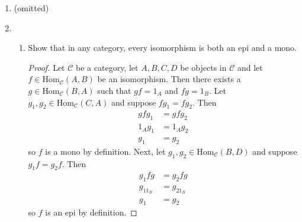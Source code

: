 \documentclass[11pt,oneside,english]{amsart}
\theoremstyle{definition}
\newcommand{\MS}[1]{\mathscr{#1}}
\newcommand{\im}{\text{im\,}}
\newcommand{\Hom}{\text{Hom}}
\begin{document}
\begin{enumerate}[leftmargin=*]
{\begin{proof}
Next we show that $\gamma_2$ is injective. Let $m_{2}\in\ker\gamma_{2}$, so $\gamma_{2}(m_{2})=0$. By commutativity, $\gamma_{1}\alpha_{2}(m_{2})=\beta_{2}\gamma_{2}(m_{2})=\beta_{2}(0)=0$. By injectivity of $\gamma_{1}$, $\alpha_{2}(m_{2})=0$ so $m_{2}\in\ker\alpha_{2}=\im\alpha_{3}$. Hence there exists an $m_{3}\in M_{3}$ such that $\alpha_{3}(m_{3})=m_{2}$. Now by substitution and commutativity, $0=\gamma_{2}(m_{2})=\gamma_{2}\alpha_{3}(m_{3})=\beta_{3}\gamma_{3}(m_{3})$. Thus, $\beta_{3}\gamma_{3}(m_{3})=0$ so $\gamma_{3}(m_{3})\in\ker\beta_{3}=\text{im}\beta_{4}$. So there exists an $n_{4}\in N_{4}$ such that $\beta_{4}(n_{4})=\gamma_{3}(m_{3})$. By surjectivity of $\gamma_{4}$ there exists an $m_{4}\in M_{4}$ such that $\gamma_{4}(m_{4})=n_{4}$. So by substitution, $\gamma_{3}(m_{3})=\beta_{4}(n_{4})=\beta_{4}\gamma_{4}(m_{4})$. By commutativity, $\gamma_{3}(m_{3})=\beta_{4}\gamma_{4}(m_{4})=\gamma_{3}\alpha_{4}(m_{4})$ so $\gamma_{3}(m_{3})-\gamma_{3}\alpha_{4}(m_{4})=\gamma_{3}(m_{3}-\alpha_{4}(m_{4}))=0$. By injectivity of $\gamma_{3}$, $m_{3}-\alpha_{4}(m_{4})=0$ so $m_{3}=\alpha_{4}(m_{4})$. Finally, by substitution and exactness, $m_{2}=\alpha_{3}(m_{3})=\alpha_{3}\alpha_{4}(m_{4})=0$. Since $m_2$ was chosen arbitrarily, $\ker\gamma_{2}=0$ and hence $\gamma_{2}$ is injective.
\end{proof}
}
\pagebreak

\item (omitted)

\item \begin{enumerate}
\item Show that in any category, every isomorphism is both an epi and a mono.

\begin{proof}
Let $\mathscr{C}$ be a category, let $A,B,C,D$ be objects in $\MS{C}$ and let $f\in\Hom_\mathscr{C}(A,B)$ be an isomorphism. Then there exists a $g\in \Hom_\MS{C}(B,A)$ such that $gf=1_A$ and $fg=1_B$. Let $g_1,g_2\in\Hom_\MS{C}(C,A)$ and suppose $fg_1=fg_2$. Then 
\begin{align*}
gfg_1&=gfg_2\\
1_Ag_1&=1_Ag_2\\
g_1&=g_2
\end{align*}
so $f$ is a mono by definition. Next, let $g_1,g_2\in\Hom_\MS{C}(B,D)$ and suppose $g_1f=g_2f$. Then
\begin{align*}
g_1fg&=g_2fg\\
g_11_B&=g_21_B\\
g_1&=g_2
\end{align*}
so $f$ is an epi by definition.
\end{proof}


\end{enumerate}
\end{enumerate}
\end{document}
